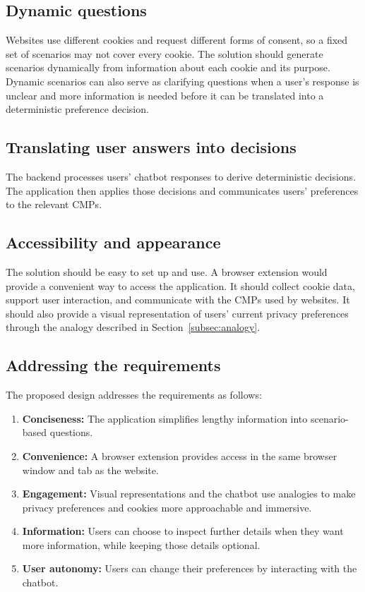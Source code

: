 \documentclass[11pt,a4paper]{report}
\begin{document}
\subsection{Dynamic questions}
Websites use different cookies and request different forms of consent, so a fixed set of scenarios may not cover every cookie. The solution should generate scenarios dynamically from information about each cookie and its purpose. Dynamic scenarios can also serve as clarifying questions when a user's response is unclear and more information is needed before it can be translated into a deterministic preference decision.
\subsection{Translating user answers into decisions}
The backend processes users' chatbot responses to derive deterministic decisions. The application then applies those decisions and communicates users' preferences to the relevant CMPs.
\subsection{Accessibility and appearance}
The solution should be easy to set up and use. A browser extension would provide a convenient way to access the application. It should collect cookie data, support user interaction, and communicate with the CMPs used by websites. It should also provide a visual representation of users' current privacy preferences through the analogy described in Section~\ref{subsec:analogy}.
\subsection{Addressing the requirements}
The proposed design addresses the requirements as follows:
\begin{enumerate}
  \item \textbf{Conciseness:} The application simplifies lengthy information into scenario-based questions.
  \item \textbf{Convenience:} A browser extension provides access in the same browser window and tab as the website.
  \item \textbf{Engagement:} Visual representations and the chatbot use analogies to make privacy preferences and cookies more approachable and immersive.
  \item \textbf{Information:} Users can choose to inspect further details when they want more information, while keeping those details optional.
  \item \textbf{User autonomy:} Users can change their preferences by interacting with the chatbot.
\end{enumerate}
\end{document}
